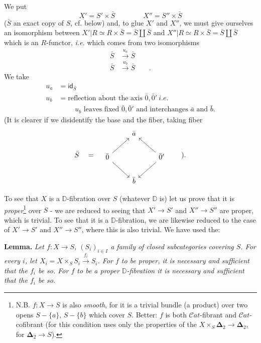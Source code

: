 \documentclass[11pt]{article}
\newcommand{\printedpage}[1]{\marginpar{\footnotesize p.~#1}}
\newcommand{\msp}[1]{\marginpar{\footnotesize [#1]}}
\newcommand{\Cat}{\mathcal{C}\mathit{at}}
\newcommand{\D}{\mathbb{D}}
\begin{document}
\printedpage{54}

\msp{page 88}
We put
\[ X' = S' \times \bar S \qquad\qquad X'' = S'' \times \bar S \]
($\bar S$ an exact copy of $S$, cf. below) and, to glue $X'$ and $X''$, we must give ourselves an isomorphism between $X'|R \simeq R \times \bar S = \bar S \amalg \bar S$ and $X''|R \simeq R \times \bar S = \bar S \amalg \bar S$ which is an $R$-functor, \textit{i.e.} which comes from two isomorphisms
\[
\begin{aligned}
\bar S &\xrightarrow{u_a} \bar S \\
\bar S &\xrightarrow{u_b} \bar S \qquad .
\end{aligned}
\]
We take
\[
\begin{aligned}
u_a &= \mathsf{id}_{\bar S} \\
u_b &= \text{reflection about the axis } \bar 0, \bar 0' \ \textit{i.e.} %
\\
&\phantom{=}\quad u_b \text{ leaves fixed } \bar 0, \bar 0' \text{ and interchanges } \bar a \text{ and } \bar b.
\end{aligned}
\]
(It is clearer if we disidentify the base and the fiber, taking fiber
\[
\bar S \quad = \quad
\begin{tikzcd}
 & \bar a & \\
\bar 0 \arrow[ur] \arrow[dr] & & \bar 0' \arrow[ul] \arrow[dl] \\
 & \bar b &
\end{tikzcd}
\qquad ).
\]

To see that $X$ is a $\D$-fibration over $S$ (whatever $\D$ is) let us prove that it is \textit{proper}\footnote[45]{N.B. $f : X \to S$ is also \textit{smooth}, for it is a trivial bundle (a product) over two opens $S - \{a\}$, $S - \{b\}$ which cover $S$. Better: $f$ is both $\Cat$-fibrant and $\Cat$-cofibrant (for this condition uses only the properties of the $X \times_S \boldsymbol{\Delta}_2 \to \boldsymbol{\Delta}_2$, for $\boldsymbol{\Delta}_2 \to S$).} over $S$ - we are reduced to seeing that $X' \to S'$ and $X'' \to S''$ are proper, which is trivial. To see that it is a $\D$-fibration, we are likewise reduced to the case of $X' \to S'$ and $X'' \to S''$, where this is also trivial. We have used the: %

\textbf{Lemma.} \textit{Let $f : X \to S$, $(S_i)_{i \in I}$ a family of closed subcategories covering $S$. For every $i$, let $X_i = X \times_S S_i \xrightarrow{f_i} S_i$. For $f$ to be proper, it is necessary and sufficient that the $f_i$ be so. For $f$ to be a proper $\D$-fibration it is necessary and sufficient that the $f_i$ be so.}
\end{document}
